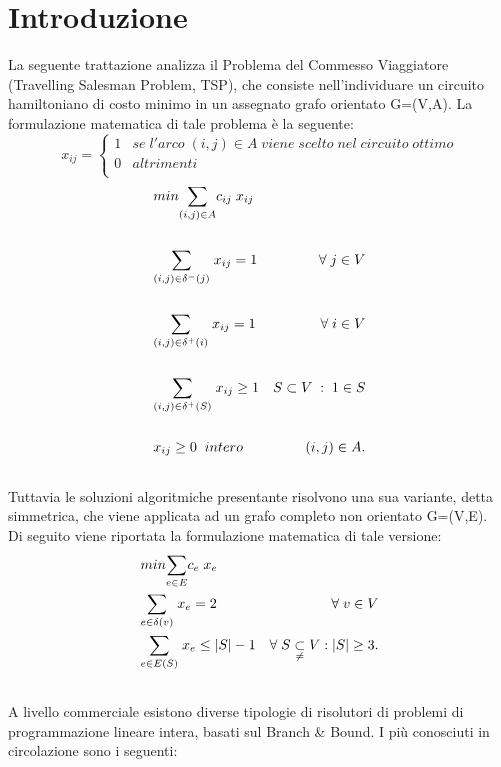 \chapter{Introduzione}\label{intro}
La seguente trattazione analizza il Problema del Commesso Viaggiatore (Travelling Salesman Problem, TSP), che consiste nell'individuare un circuito hamiltoniano di costo minimo in un assegnato grafo orientato G=(V,A)\cite{TSP}. La formulazione matematica di tale problema è la seguente:
$$
x_{ij}=
\begin{cases}
1 & se\;l'arco\;(i,j)\in A\;viene\;scelto\;nel\;circuito\;ottimo\\
0 & altrimenti\\
\end{cases}
$$
\begin{align}
& min \underset{(i,j)\in A}\sum{c_{ij}\;x_{ij}} \\\notag \\
& \underset{(i,j)\in \delta^{-}(j)}\sum{\;x_{ij}} = 1 & \forall\;j\in V \\\notag \\
& \underset{(i,j)\in \delta^{+}(i)}\sum{\;x_{ij}} = 1 & \forall\;i\in V \\\notag \\
& \underset{(i,j)\in \delta^{+}(S)}\sum{\;x_{ij}} \geq 1 & S \subset V\; :\; 1\in S\\\notag \\
& x_{ij}\geq 0\;\; intero & (i,j)\in A.\\\notag
\end{align}
Tuttavia le soluzioni algoritmiche presentante risolvono una sua variante, detta simmetrica, che viene applicata ad un grafo completo non orientato G=(V,E).\\ Di seguito viene riportata la formulazione matematica di tale versione:\\
\begin{align}
& min \underset{e\in E}\sum{c_e\;x_e}\\
& \underset{e\in \delta(v)}\sum{\;x_e} = 2 & \forall\;v\in V \\
& \underset{e\in E(S)}\sum{\;x_e} \leq \vert S\vert - 1 & \forall\;S\underset{\neq} \subset V: \vert S\vert\geq 3.\\\notag
\end{align}
A livello commerciale esistono diverse tipologie di risolutori di problemi di programmazione lineare intera, basati sul Branch \& Bound. I più conosciuti in circolazione sono i seguenti:
